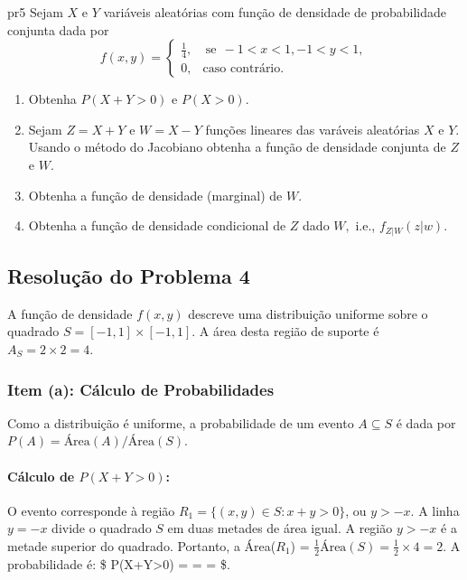 \documentclass[
]{article}
\begin{document}
\newpage
\begin{problema}{}{pr5}
Sejam $X$ e $Y$ variáveis aleatórias com função de densidade de probabilidade conjunta dada por 
$$ f(x,y) = 
\begin{cases}
    \frac{1}{4}, & \ \text{se} \  \  -1<x<1,  -1<y<1, \\
    0, &  \text{caso contrário.}
\end{cases}
$$

\begin{enumerate}
    \item  Obtenha $P(X+Y> 0)$ e $P(X>0).$
    \item Sejam $Z=X+Y$ e $W=X-Y$ funções lineares das varáveis aleatórias $X$ e $Y.$ Usando o método do Jacobiano obtenha a função de densidade conjunta de $Z$ e $W.$
    \item Obtenha a função de densidade (marginal) de $W$.
    \item  Obtenha a função de densidade condicional de $Z$ dado $W,$ i.e., $f_{Z|W}(z|w).$
\end{enumerate}
\end{problema}

\subsection*{Resolução do Problema 4}

A função de densidade \(f(x,y)\) descreve uma distribuição uniforme
sobre o quadrado \(S = [-1,1] \times [-1,1]\). A área desta região de
suporte é \(A_S = 2 \times 2 = 4\).

\subsubsection*{Item (a): Cálculo de Probabilidades}

Como a distribuição é uniforme, a probabilidade de um evento
\(A \subseteq S\) é dada por \(P(A) = \text{Área}(A) / \text{Área}(S)\).

\paragraph{Cálculo de $P(X+Y>0)$:}

O evento corresponde à região \(R_1 = \{ (x,y) \in S : x+y > 0 \}\), ou
\(y > -x\). A linha \(y=-x\) divide o quadrado \(S\) em duas metades de
área igual. A região \(y > -x\) é a metade superior do quadrado.
Portanto, a Área(\(R_1\)) =
\(\frac{1}{2} \text{Área}(S) = \frac{1}{2} \times 4 = 2\). A
probabilidade é: \$ P(X+Y\textgreater0) =
 =  = \$.
\end{document}
